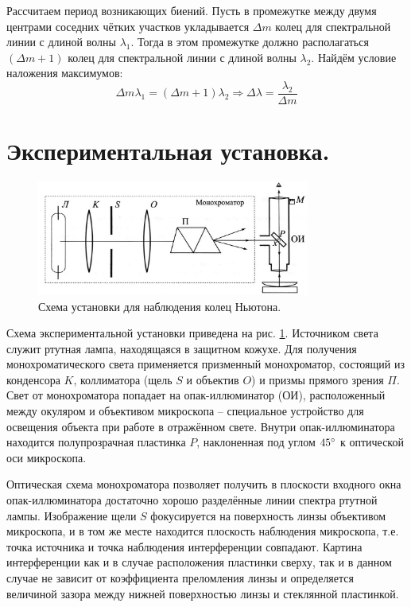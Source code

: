 \documentclass[a4paper, 12pt, twoside]{article}
\begin{document}
	Рассчитаем период возникающих биений. Пусть в промежутке между двумя центрами соседних чётких участков укладывается $\Delta m$ колец для спектральной линии с длиной волны $\lambda_1$. Тогда в этом промежутке должно располагаться $(\Delta m + 1)$ колец для спектральной линии с длиной волны $\lambda_2$. Найдём условие наложения максимумов:
	\begin{equation}
	\Delta m \lambda_1 = (\Delta m + 1)\lambda_2 \Longrightarrow \Delta \lambda = \dfrac{\lambda_2}{\Delta m}
	\label{eq3}
	\end{equation}
	
	\section{Экспериментальная установка.}
	
	\begin{figure}[H]
		\centering
		\includegraphics[width =  0.8\textwidth]{img2}
		\caption{Схема установки для наблюдения колец Ньютона.}
		\label{img2}
	\end{figure}

	Схема экспериментальной установки приведена на рис. \ref{img2}. Источником света служит ртутная лампа, находящаяся в защитном кожухе. Для получения монохроматического света применяется призменный монохроматор, состоящий из конденсора $K$, коллиматора (щель $S$ и объектив $O$) и призмы прямого зрения $\Pi$. Свет от монохроматора попадает на опак-иллюминатор (ОИ), расположенный между окуляром и объективом микроскопа -- специальное устройство для освещения объекта при работе в отражённом свете. Внутри опак-иллюминатора находится полупрозрачная пластинка $P$, наклоненная под углом $45\degree$ к оптической оси микроскопа.
	
	Оптическая схема монохроматора позволяет получить в плоскости входного окна опак-иллюминатора достаточно хорошо разделённые линии спектра ртутной лампы. Изображение щели $S$ фокусируется на поверхность линзы объективом микроскопа, и в том же месте находится плоскость наблюдения микроскопа, т.е. точка источника и точка наблюдения интерференции совпадают. Картина интерференции как и в случае расположения пластинки сверху, так и в данном случае не зависит от коэффициента преломления линзы и определяется величиной зазора между нижней поверхностью линзы и стеклянной пластинкой.
	
\end{document}
